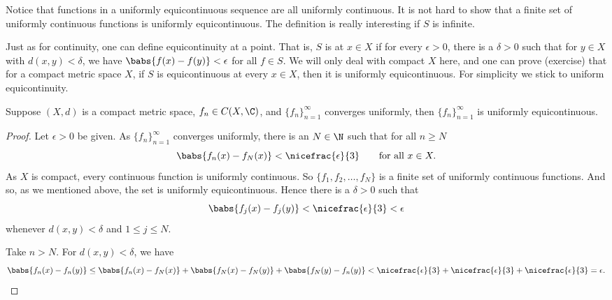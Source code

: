 Notice that functions in a uniformly equicontinuous sequence are
all uniformly continuous.  It is 
not hard to show that a finite set of uniformly continuous functions
is uniformly equicontinuous.  The definition is really interesting
if $S$ is infinite.

Just as for continuity, one can define equicontinuity at a point.
That is, $S$ is \emph{} at $x \in X$
if for every $\epsilon > 0$, there is a $\delta > 0$
such that for $y \in X$ with $d(x,y) < \delta$, we have
$\babs{f(x)-f(y)} < \epsilon$ for all $f \in S$.
We will only deal with compact $X$ here, and
one can prove (exercise) that for a compact metric space $X$,
if $S$ is equicontinuous at every $x \in X$,
then it is uniformly equicontinuous.  For simplicity
we stick to uniform equicontinuity.

\begin{prop}
Suppose $(X,d)$ is a compact metric space,
$f_n \in C(X,\C)$, and $\{ f_n \}_{n=1}^\infty$
converges uniformly, then $\{ f_n \}_{n=1}^\infty$ is uniformly equicontinuous.
\end{prop}

\begin{proof}
Let $\epsilon > 0$ be given.
As $\{ f_n \}_{n=1}^\infty$ converges uniformly, there is an $N \in \N$ such that for
all $n \geq N$
\begin{equation*}
\babs{f_n(x)-f_N(x)} < \nicefrac{\epsilon}{3} \qquad \text{for all } x \in X.
\end{equation*}
As $X$ is compact, every continuous function is uniformly continuous.
So $\{ f_1,f_2,\ldots,f_N \}$ is a finite set of uniformly continuous
functions.  And so, as we mentioned above, the set is uniformly equicontinuous.
Hence there is a $\delta > 0$ such that
\begin{equation*}
\babs{f_j(x)-f_j(y)} < \nicefrac{\epsilon}{3} < \epsilon
\end{equation*}
whenever $d(x,y) < \delta$ and $1 \leq j \leq N$.

Take $n > N$.  For $d(x,y) < \delta$, we have
\begin{equation*}
\babs{f_n(x)-f_n(y)}
\leq
\babs{f_n(x)-f_N(x)}
+
\babs{f_N(x)-f_N(y)}
+
\babs{f_N(y)-f_n(y)}
<
\nicefrac{\epsilon}{3}
+
\nicefrac{\epsilon}{3}
+
\nicefrac{\epsilon}{3}
=\epsilon . \qedhere
\end{equation*}
\end{proof}

